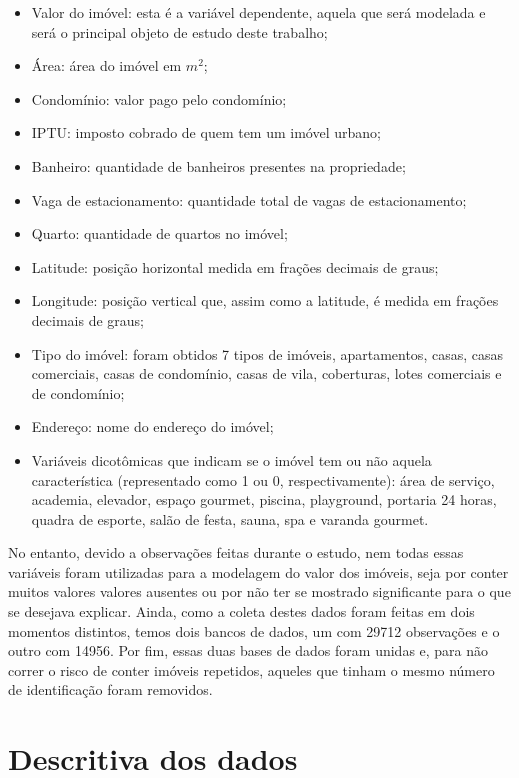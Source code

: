 \documentclass[
  12pt,
  letterpaper,
  DIV=11,
  numbers=noendperiod]{scrreprt}
\begin{document}
\begin{itemize}
\item
  Valor do imóvel: esta é a variável dependente, aquela que será
  modelada e será o principal objeto de estudo deste trabalho;
\item
  Área: área do imóvel em \(m^2\);
\item
  Condomínio: valor pago pelo condomínio;
\item
  IPTU: imposto cobrado de quem tem um imóvel urbano;
\item
  Banheiro: quantidade de banheiros presentes na propriedade;
\item
  Vaga de estacionamento: quantidade total de vagas de estacionamento;
\item
  Quarto: quantidade de quartos no imóvel;
\item
  Latitude: posição horizontal medida em frações decimais de graus;
\item
  Longitude: posição vertical que, assim como a latitude, é medida em
  frações decimais de graus;
\item
  Tipo do imóvel: foram obtidos 7 tipos de imóveis, apartamentos, casas,
  casas comerciais, casas de condomínio, casas de vila, coberturas,
  lotes comerciais e de condomínio;
\item
  Endereço: nome do endereço do imóvel;
\item
  Variáveis dicotômicas que indicam se o imóvel tem ou não aquela
  característica (representado como 1 ou 0, respectivamente): área de
  serviço, academia, elevador, espaço gourmet, piscina, playground,
  portaria 24 horas, quadra de esporte, salão de festa, sauna, spa e
  varanda gourmet.
\end{itemize}

\vspace{12pt}

No entanto, devido a observações feitas durante o estudo, nem todas
essas variáveis foram utilizadas para a modelagem do valor dos imóveis,
seja por conter muitos valores valores ausentes ou por não ter se
mostrado significante para o que se desejava explicar. Ainda, como a
coleta destes dados foram feitas em dois momentos distintos, temos dois
bancos de dados, um com 29712 observações e o outro com 14956. Por fim,
essas duas bases de dados foram unidas e, para não correr o risco de
conter imóveis repetidos, aqueles que tinham o mesmo número de
identificação foram removidos.

\section{Descritiva dos dados}\label{descritiva-dos-dados}
\end{document}
